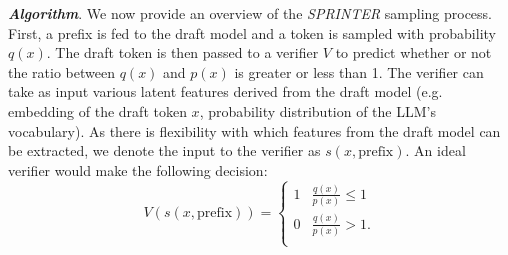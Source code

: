 \documentclass{article}
\theoremstyle{plain}
\theoremstyle{definition}
\theoremstyle{remark}
\begin{document}


\textit{\textbf{Algorithm}}. We now provide an overview of the \textit{SPRINTER} sampling process. First, a prefix is fed to the draft model and a token is sampled with probability $q(x)$. The draft token is then passed to a verifier $V$ to predict whether or not the ratio between $q(x)$ and $p(x)$ is greater or less than 1. The verifier can take as input various latent features derived from the draft model (e.g. embedding of the draft token $x$, probability distribution of the LLM's vocabulary). As there is flexibility with which features from the draft model can be extracted, we denote the input to the verifier as $s(x,\text{prefix})$. An ideal verifier would make the following decision: 
\[
{V(s(x,\text{prefix}))} =
\begin{cases}
1   & \frac{q(x)}{p(x)} \leq 1  \\

0& \frac{q(x)}{p(x)} > 1. \\
\end{cases}
\]
\end{document}
